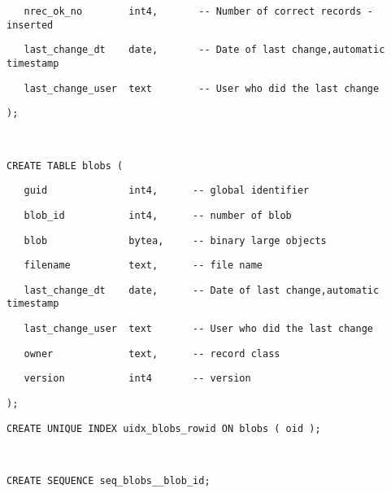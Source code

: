 \begin{table}[htbp]
\texttt{\scriptsize ~~ nrec\_ok\_no~~~~~~~ int4,~~~~~~
-{}- Number of correct records - inserted}{\scriptsize \par}

\texttt{\scriptsize ~~ last\_change\_dt~~~ date,~~~~~~
-{}- Date of last change,automatic timestamp}{\scriptsize \par}

\texttt{\scriptsize ~~ last\_change\_user~ text~~~~~~~ -{}-
User who did the last change}{\scriptsize \par}

\texttt{\scriptsize );}{\scriptsize \par}

~

\texttt{\scriptsize CREATE TABLE blobs ( }{\scriptsize \par}

\texttt{\scriptsize ~~ guid~~~~~~~~~~~~~ int4,~~~~~
-{}- global identifier}{\scriptsize \par}

\texttt{\scriptsize ~~ blob\_id~~~~~~~~~~ int4,~~~~~
-{}- number of blob}{\scriptsize \par}

\texttt{\scriptsize ~~ blob~~~~~~~~~~~~~ bytea,~~~~
-{}- binary large objects}{\scriptsize \par}

\texttt{\scriptsize ~~ filename~~~~~~~~~ text,~~~~~
-{}- file name}{\scriptsize \par}

\texttt{\scriptsize ~~ last\_change\_dt~~~ date,~~~~~ -{}-
Date of last change,automatic timestamp}{\scriptsize \par}

\texttt{\scriptsize ~~ last\_change\_user~ text~~~~~~ -{}-
User who did the last change}{\scriptsize \par}

\texttt{\scriptsize ~~ owner~~~~~~~~~~~~ text,~~~~~
-{}- record class}{\scriptsize \par}

\texttt{\scriptsize ~~ version~~~~~~~~~~ int4~~~~~~
-{}- version}{\scriptsize \par}

\texttt{\scriptsize ); }{\scriptsize \par}

\texttt{\scriptsize CREATE UNIQUE INDEX uidx\_blobs\_rowid ON blobs
( oid );}{\scriptsize \par}

~

\texttt{\scriptsize CREATE SEQUENCE seq\_blobs\_\_blob\_id;}
\end{table}



